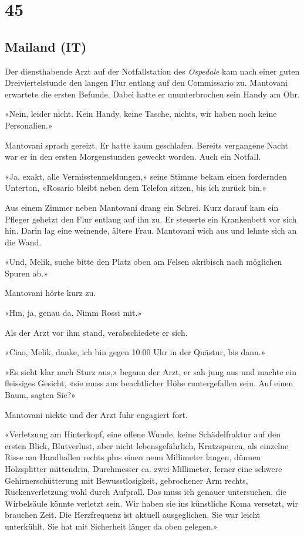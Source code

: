 \chapter{45}

\section{Mailand (IT)} 



Der diensthabende Arzt auf der Notfallstation des \emph{Ospedale} kam nach einer guten Dreiviertelstunde den langen Flur entlang auf den Commissario zu. Mantovani erwartete die ersten Befunde. Dabei hatte er ununterbrochen sein Handy am Ohr.

«Nein, leider nicht. Kein Handy, keine Tasche, nichts, wir haben noch keine Personalien.»

Mantovani sprach gereizt. Er hatte kaum geschlafen. Bereits vergangene Nacht war er in den ersten Morgenstunden geweckt worden. Auch ein Notfall.

«Ja, exakt, alle Vermisstenmeldungen,» seine Stimme bekam einen fordernden Unterton, «Rosario bleibt neben dem Telefon sitzen, bis ich zurück bin.»

Aus einem Zimmer neben Mantovani drang ein Schrei. Kurz darauf kam ein Pfleger gehetzt den Flur entlang auf ihn zu. Er steuerte ein Krankenbett vor sich hin. Darin lag eine weinende, ältere Frau. Mantovani wich aus und lehnte sich an die Wand.

«Und, Melik, suche bitte den Platz oben am Felsen akribisch nach möglichen Spuren ab.»

Mantovani hörte kurz zu.

«Hm, ja, genau da. Nimm Rossi mit.»

Als der Arzt vor ihm stand, verabschiedete er sich.

«Ciao, Melik, danke, ich bin gegen 10:00 Uhr in der Quästur, bis dann.»

\sectionbreak

«Es sieht klar nach Sturz aus,» begann der Arzt, er sah jung aus und machte ein fleissiges Gesicht, «sie
muss aus beachtlicher Höhe runtergefallen sein. Auf einen Baum, sagten
Sie?»

Mantovani nickte und der Arzt fuhr engagiert fort.

«Verletzung am Hinterkopf, eine offene Wunde, keine Schädelfraktur auf
den ersten Blick, Blutverlust, aber nicht lebensgefährlich, Kratzspuren,
als einzelne Risse am Handballen rechts plus einen neun Millimeter
langen, dünnen Holzsplitter mittendrin, Durchmesser ca. zwei Millimeter,
ferner eine schwere Gehirnerschütterung mit Bewusstlosigkeit,
gebrochener Arm rechts, Rückenverletzung wohl durch Aufprall. Das muss
ich genauer untersuchen, die Wirbelsäule könnte verletzt sein. Wir haben
sie ins künstliche Koma versetzt, wir brauchen Zeit. Die Herzfrequenz ist
aktuell ausgeglichen. Sie war leicht unterkühlt. Sie hat mit Sicherheit
länger da oben gelegen.»

